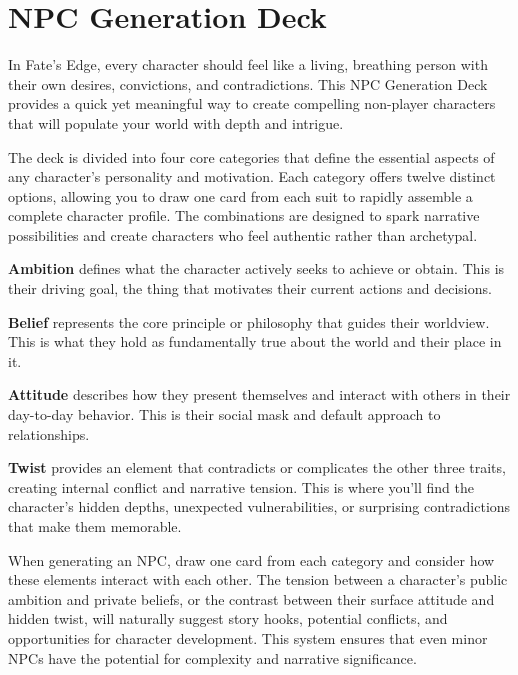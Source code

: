 




















\section{NPC Generation Deck}

In Fate's Edge, every character should feel like a living, breathing person with their own desires, convictions, and contradictions. This NPC Generation Deck provides a quick yet meaningful way to create compelling non-player characters that will populate your world with depth and intrigue.

The deck is divided into four core categories that define the essential aspects of any character's personality and motivation. Each category offers twelve distinct options, allowing you to draw one card from each suit to rapidly assemble a complete character profile. The combinations are designed to spark narrative possibilities and create characters who feel authentic rather than archetypal.

\textbf{Ambition} defines what the character actively seeks to achieve or obtain. This is their driving goal, the thing that motivates their current actions and decisions.

\textbf{Belief} represents the core principle or philosophy that guides their worldview. This is what they hold as fundamentally true about the world and their place in it.

\textbf{Attitude} describes how they present themselves and interact with others in their day-to-day behavior. This is their social mask and default approach to relationships.

\textbf{Twist} provides an element that contradicts or complicates the other three traits, creating internal conflict and narrative tension. This is where you'll find the character's hidden depths, unexpected vulnerabilities, or surprising contradictions that make them memorable.

When generating an NPC, draw one card from each category and consider how these elements interact with each other. The tension between a character's public ambition and private beliefs, or the contrast between their surface attitude and hidden twist, will naturally suggest story hooks, potential conflicts, and opportunities for character development. This system ensures that even minor NPCs have the potential for complexity and narrative significance.

